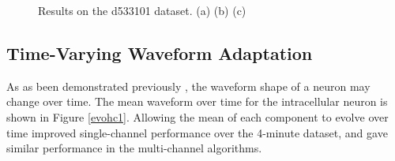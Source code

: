 \begin{center}
\begin{figure}[h!]
\begin{subfigure}[b]{.49\textwidth}
\caption{}
\label{fig:resid}
\end{subfigure}
\caption{Results on the d533101 dataset.  (a)  (b)  (c) }
\end{figure}
\end{center}



\subsection{Time-Varying Waveform Adaptation} \label{sub:adapt}
As as been demonstrated previously \cite{calabrese2011kalman}, the waveform shape of a neuron may change over time.  The mean waveform over time for the intracellular neuron is shown in Figure \ref{evohc1}.  Allowing the mean of each component to evolve over time improved single-channel performance over the 4-minute dataset, and gave similar performance in the multi-channel algorithms.


